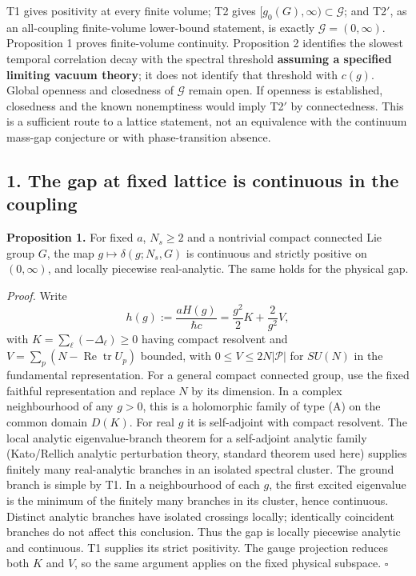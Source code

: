 \documentclass[11pt,a4paper]{article}
\begin{document}
T1 gives positivity at every finite volume; T2 gives
\([g_0(G),\infty)\subset\mathcal G\); and T2\('\), as an all-coupling
finite-volume lower-bound statement, is exactly
\(\mathcal G=(0,\infty)\). Proposition 1 proves finite-volume
continuity. Proposition 2 identifies the slowest temporal correlation
decay with the spectral threshold \textbf{assuming a specified limiting
vacuum theory}; it does not identify that threshold with \(c(g)\).
Global openness and closedness of \(\mathcal G\) remain open. If
openness is established, closedness and the known nonemptiness would
imply T2\('\) by connectedness. This is a sufficient route to a lattice
statement, not an equivalence with the continuum mass-gap conjecture or
with phase-transition absence.

\subsection{1. The gap at fixed lattice is continuous in the
coupling}\label{the-gap-at-fixed-lattice-is-continuous-in-the-coupling}

\textbf{Proposition 1.} For fixed \(a\), \(N_s\ge2\) and a nontrivial
compact connected Lie group \(G\), the map \(g\mapsto\delta(g;N_s,G)\)
is continuous and strictly positive on \((0,\infty)\), and locally
piecewise real-analytic. The same holds for the physical gap.

\emph{Proof.} Write
\[h(g):=\frac{aH(g)}{\hbar c}=\frac{g^2}{2}K+\frac{2}{g^2}V,\] with
\(K=\sum_\ell(-\Delta_\ell)\ge0\) having compact resolvent and
\(V=\sum_p(N-\operatorname{Re}\operatorname{tr}U_p)\) bounded, with
\(0\le V\le2N|\mathcal P|\) for \(SU(N)\) in the fundamental
representation. For a general compact connected group, use the fixed
faithful representation and replace \(N\) by its dimension. In a complex
neighbourhood of any \(g>0\), this is a holomorphic family of type (A)
on the common domain \(D(K)\). For real \(g\) it is self-adjoint with
compact resolvent. The local analytic eigenvalue-branch theorem for a
self-adjoint analytic family (Kato/Rellich analytic perturbation theory,
standard theorem used here) supplies finitely many real-analytic
branches in an isolated spectral cluster. The ground branch is simple by
T1. In a neighbourhood of each \(g\), the first excited eigenvalue is
the minimum of the finitely many branches in its cluster, hence
continuous. Distinct analytic branches have isolated crossings locally;
identically coincident branches do not affect this conclusion. Thus the
gap is locally piecewise analytic and continuous. T1 supplies its strict
positivity. The gauge projection reduces both \(K\) and \(V\), so the
same argument applies on the fixed physical subspace. \(\square\)
\end{document}
